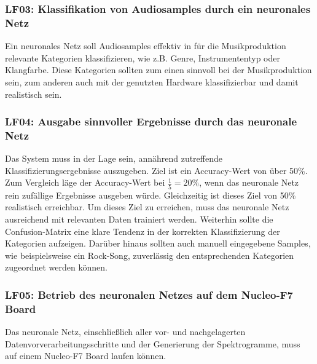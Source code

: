 \subsubsection{LF03: Klassifikation von Audiosamples durch ein neuronales Netz}
Ein neuronales Netz soll Audiosamples effektiv in für die Musikproduktion relevante Kategorien klassifizieren, wie z.B. Genre, Instrumententyp oder Klangfarbe. Diese Kategorien sollten zum einen sinnvoll bei der Musikproduktion sein, zum anderen auch mit der genutzten Hardware klassifizierbar und damit realistisch sein.

\subsubsection{LF04: Ausgabe sinnvoller Ergebnisse durch das neuronale Netz}
Das System muss in der Lage sein, annährend zutreffende Klassifizierungsergebnisse auszugeben. Ziel ist ein Accuracy-Wert von über 50\%. Zum Vergleich läge der Accuracy-Wert bei \textit{$\frac{1}{5} = 20\%$}, wenn das neuronale Netz rein zufällige Ergebnisse ausgeben würde. Gleichzeitig ist dieses Ziel von 50\% realistisch erreichbar. Um dieses Ziel zu erreichen, muss das neuronale Netz ausreichend mit relevanten Daten trainiert werden.
Weiterhin sollte die Confusion-Matrix eine klare Tendenz in der korrekten Klassifizierung der Kategorien aufzeigen. Darüber hinaus sollten auch manuell eingegebene Samples, wie beispielsweise ein Rock-Song, zuverlässig den entsprechenden Kategorien zugeordnet werden können. 

\subsubsection{LF05: Betrieb des neuronalen Netzes auf dem Nucleo-F7 Board}
Das neuronale Netz, einschließlich aller vor- und nachgelagerten Datenvorverarbeitungsschritte und der Generierung der Spektrogramme, muss auf einem Nucleo-F7 Board laufen können.